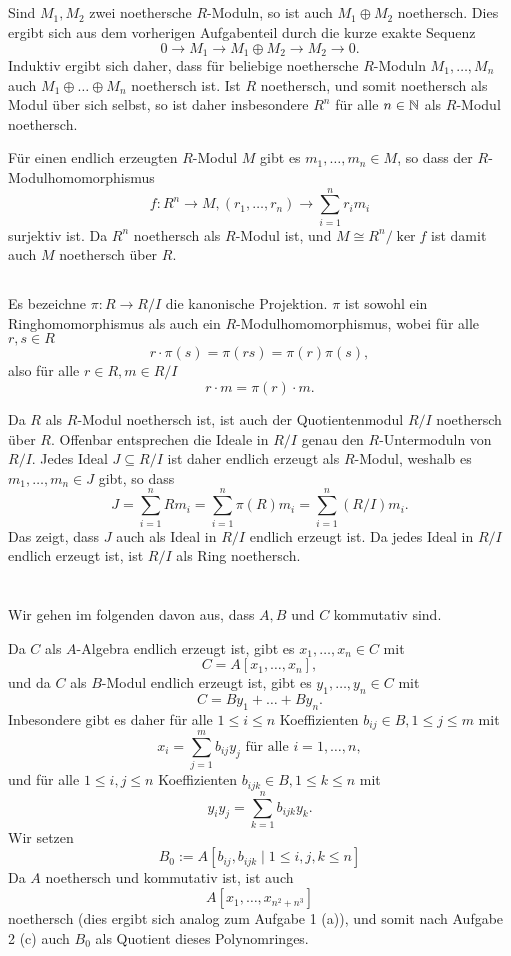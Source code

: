 \documentclass[a4paper,10pt]{article}
\begin{document}
\subsection{}
Sind $M_1, M_2$ zwei noethersche $R$-Moduln, so ist auch $M_1 \oplus M_2$ noethersch. Dies ergibt sich aus dem vorherigen Aufgabenteil durch die kurze exakte Sequenz
\[
 0 \to M_1 \to M_1 \oplus M_2 \to M_2 \to 0.
\]
Induktiv ergibt sich daher, dass für beliebige noethersche $R$-Moduln $M_1, \ldots, M_n$ auch $M_1 \oplus \ldots \oplus M_n$ noethersch ist. Ist $R$ noethersch, und somit noethersch als Modul über sich selbst, so ist daher insbesondere $R^n$ für alle $n \in \mathbb{N}$ als $R$-Modul noethersch.

Für einen endlich erzeugten $R$-Modul $M$ gibt es $m_1, \ldots, m_n \in M$, so dass der $R$-Modulhomomorphismus
\[
 f: R^n \to M, (r_1, \ldots, r_n) \to \sum_{i=1}^n r_i m_i
\]
surjektiv ist. Da $R^n$ noethersch als $R$-Modul ist, und $M \cong R^n / \ker f$ ist damit auch $M$ noethersch über $R$.


\subsection{}
Es bezeichne $\pi : R \to R/I$ die kanonische Projektion. $\pi$ ist sowohl ein Ringhomomorphismus als auch ein $R$-Modulhomomorphismus, wobei für alle $r, s \in R$
\[
 r \cdot \pi(s) = \pi(rs) = \pi(r) \pi(s),
\]
also für alle $r \in R, m \in R/I$
\[
 r \cdot m = \pi(r) \cdot m.
\]

Da $R$ als $R$-Modul noethersch ist, ist auch der Quotientenmodul $R/I$ noethersch über $R$. Offenbar entsprechen die Ideale in $R/I$ genau den $R$-Untermoduln von $R/I$. Jedes Ideal $J \subseteq R/I$ ist daher endlich erzeugt als $R$-Modul, weshalb es $m_1, \ldots, m_n \in J$ gibt, so dass
\[
 J = \sum_{i=1}^n R m_i = \sum_{i=1}^n \pi(R) m_i = \sum_{i=1}^n (R/I) m_i.
\]
Das zeigt, dass $J$ auch als Ideal in $R/I$ endlich erzeugt ist. Da jedes Ideal in $R/I$ endlich erzeugt ist, ist $R/I$ als Ring noethersch.


\section{}
Wir gehen im folgenden davon aus, dass $A, B$ und $C$ kommutativ sind.

Da $C$ als $A$-Algebra endlich erzeugt ist, gibt es $x_1, \ldots, x_n \in C$ mit
\[
 C = A[x_1, \ldots, x_n],
\]
und da $C$ als $B$-Modul endlich erzeugt ist, gibt es $y_1, \ldots, y_n \in C$ mit
\[
 C = By_1 + \ldots + By_n.
\]
Inbesondere gibt es daher für alle $1 \leq i \leq n$ Koeffizienten $b_{ij} \in B, 1 \leq j \leq m$ mit
\[
 x_i = \sum_{j=1}^m b_{ij} y_j \text{ für alle } i = 1, \ldots, n,
\]
und für alle $1 \leq i,j \leq n$ Koeffizienten $b_{ijk} \in B, 1 \leq k \leq n$ mit
\[
 y_i y_j = \sum_{k=1}^n b_{ijk} y_k.
\]
Wir setzen
\[
 B_0 := A[b_{ij}, b_{ijk} \mid 1 \leq i,j,k \leq n]
\]
Da $A$ noethersch und kommutativ ist, ist auch
\[
 A[x_1, \ldots, x_{n^2 + n^3}]
\]
noethersch (dies ergibt sich analog zum Aufgabe 1 (a)), und somit nach Aufgabe 2 (c) auch $B_0$ als Quotient dieses Polynomringes. 
\end{document}
